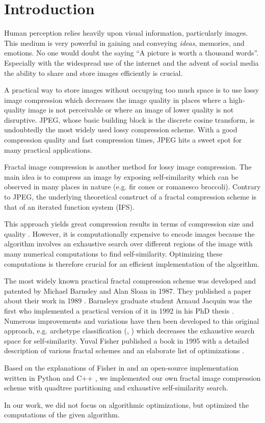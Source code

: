 \section{Introduction}\label{sec:intro}

Human perception relies heavily upon visual information, particularly images.
This medium is very powerful in gaining and conveying \textit{ideas}, memories,
and emotions. No one would doubt the saying ``A picture is worth a thousand
words''. Especially with the widespread use of the internet and the advent of
social media the ability to share and store images efficiently is crucial.

A practical way to store images without occupying too much space is to use lossy
image compression which decreases the image quality in places where a
high-quality image is not perceivable or where an image of lower quality is not
disruptive. JPEG, whose basic building block is the discrete cosine transform,
is undoubtedly the most widely used lossy compression scheme. With a good
compression quality and fast compression times, JPEG hits a sweet spot for many
practical applications.

Fractal image compression is another method for lossy image compression. The
main idea is to compress an image by exposing self-similarity which can be
observed in many places in nature (e.g. fir cones or romanesco broccoli). 
Contrary to JPEG, the underlying theoretical construct of a fractal compression
scheme is that of an iterated function system (IFS). 

This approach yields great
compression results in terms of compression size and quality \cite{fisher2012}.
However, it is computationally expensive to encode images because the algorithm
involves an exhaustive search over different regions of the image with many
numerical computations to find self-similarity. Optimizing these computations is
therefore crucial for an efficient implementation of the algorithm.

 The most widely known practical fractal compression scheme
was developed and patented by Michael Barnsley and Alan Sloan in 1987. They
published a paper about their work in 1989 \cite{barnsley1989fractal}. Barnsleys
graduate student Arnaud Jacquin was the first who implemented a practical
version of it in 1992 in his PhD thesis \cite{jacquin1990fractal}. Numerous
improvements and variations have then been developed to this original approach,
e.g. archetype classification (\cite{jacobs1992image}, \cite{boss1991studies})
which decreases the exhaustive search space for self-similarity. Yuval Fisher
published a book in 1995 with a detailed description of various fractal schemes
and an elaborate list of optimizations \cite{fisher2012}.

 Based on the explanations of Fisher in \cite{fisher2012}
and an open-source implementation written in Python \cite{github-python} and C++
\cite{github-cpp}, we implemented our own fractal image compression scheme with
quadtree partitioning and exhaustive self-similarity search.

In our work, we did not focus on algorithmic optimizations, but optimized the
computations of the given algorithm.

